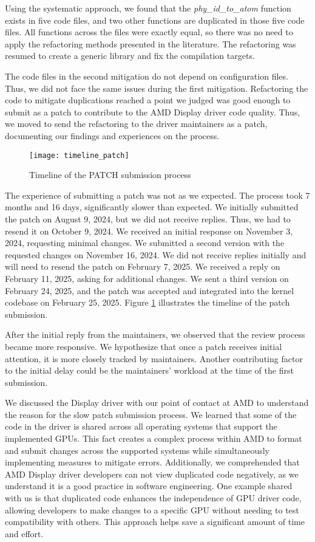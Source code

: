 Using the systematic approach, we found that the \textit{phy\_id\_to\_atom} function 
exists in five code files, and two other functions are duplicated
in those five code files. All functions across the files were exactly equal,
so there was no need to apply the refactoring methods presented in the literature.
The refactoring was resumed to create a generic library and fix the compilation targets.

The code files in the second mitigation do not depend on configuration files. Thus,
we did not face the same issues during the first mitigation. Refactoring the code
to mitigate duplications reached a point we judged was good enough to submit as a
patch to contribute to the AMD Display driver code quality. Thus, we moved to send
the refactoring to the driver maintainers as a patch, documenting our findings and experiences
on the process.

\begin{figure}
\texttt{[image: timeline\_patch]}
\caption{Timeline of the PATCH submission process}
\label{fig:timeline}
\end{figure}

The experience of submitting a patch was not as we expected. The process took 7 
months and 16 days, significantly slower than expected. We initially submitted 
the patch on August 9, 2024, but we did not receive replies. Thus, we had to 
resend it on October 9, 2024. We received an initial response on November 3, 2024, 
requesting minimal changes. We submitted a second version with the requested 
changes on November 16, 2024. We did not receive replies initially and will 
need to resend the patch on February 7, 2025. We received a reply on 
February 11, 2025, asking for additional changes. We sent a third version on 
February 24, 2025, and the patch was accepted and integrated into the kernel 
codebase on February 25, 2025. Figure \ref{fig:timeline} illustrates the 
timeline of the patch submission.

After the initial reply from the maintainers, we observed that the review process 
became more responsive. We hypothesize that once a patch receives initial attention, 
it is more closely tracked by maintainers. Another contributing factor to the initial 
delay could be the maintainers' workload at the time of the first submission.

We discussed the Display driver with our point of contact at AMD to understand the 
reason for the slow patch submission process. We learned that some of the code in 
the driver is shared across all operating systems that support the implemented GPUs. 
This fact creates a complex process within AMD to format and submit changes across 
the supported systems while simultaneously implementing measures to mitigate errors. 
Additionally, we comprehended that AMD Display driver developers can not view 
duplicated code negatively, as we understand it is a good practice in software engineering. 
One example shared with us is that duplicated code enhances the independence of 
GPU driver code, allowing developers to make changes to a specific GPU without 
needing to test compatibility with others. This approach helps save a 
significant amount of time and effort.

